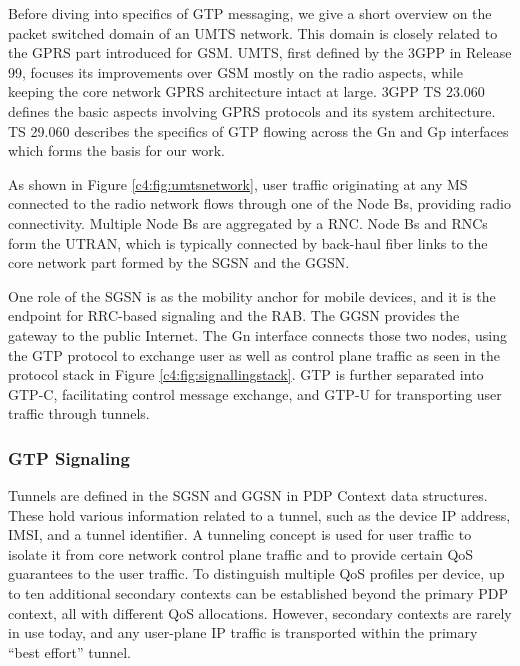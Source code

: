 Before diving into specifics of \ac{GTP} messaging, we give a short overview on the packet switched domain of an \ac{UMTS} network. This domain is closely related to the \ac{GPRS} part introduced for \acs{GSM}. \ac{UMTS}, first defined by the \ac{3GPP} in Release 99, focuses its improvements over \ac{GSM} mostly on the radio aspects, while keeping the core network \ac{GPRS} architecture intact at large. \ac{3GPP} \ac{TS} 23.060 \cite{3gpp23.060} defines the basic aspects involving \ac{GPRS} protocols and its system architecture. \ac{TS} 29.060 \cite{3gpp29.060} describes the specifics of \ac{GTP} flowing across the Gn and Gp interfaces which forms the basis for our work.

As shown in Figure \ref{c4:fig:umtsnetwork}, user traffic originating at any \ac{MS} connected to the radio network flows through one of the Node Bs, providing radio connectivity. Multiple Node Bs are aggregated by a \ac{RNC}. Node Bs and \acp{RNC} form the \ac{UTRAN}, which is typically connected by back-haul fiber links to the core network part formed by the \ac{SGSN} and the \ac{GGSN}.

One role of the \ac{SGSN} is as the mobility anchor for mobile devices, and it is the endpoint for \ac{RRC}-based signaling and the \ac{RAB}. The \ac{GGSN} provides the gateway to the public Internet. The Gn interface connects those two nodes, using the \ac{GTP} protocol to exchange user as well as control plane traffic as seen in the protocol stack in Figure \ref{c4:fig:signallingstack}. \ac{GTP} is further separated into GTP-C, facilitating control message exchange, and GTP-U for transporting user traffic through tunnels.



\subsubsection{GTP Signaling}


Tunnels are defined in the \ac{SGSN} and \ac{GGSN} in \ac{PDP} Context data structures. These hold various information related to a tunnel, such as the device IP address, \ac{IMSI}, and a tunnel identifier. A tunneling concept is used for user traffic to isolate it from core network control plane traffic and to provide certain \ac{QoS} guarantees to the user traffic. To distinguish multiple \ac{QoS} profiles per device, up to ten additional secondary contexts can be established beyond the primary PDP context, all with different \ac{QoS} allocations. However, secondary contexts are rarely in use today, and any user-plane IP traffic is transported within the primary ``best effort'' tunnel.

